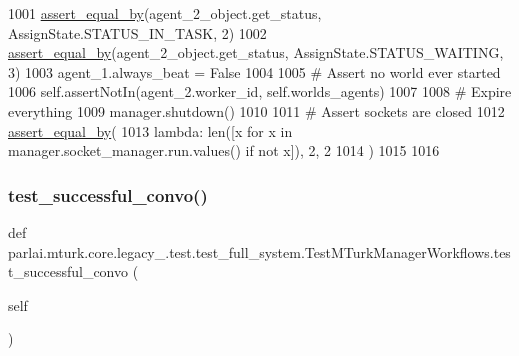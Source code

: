 \begin{DoxyCode}
1001         \hyperlink{namespaceparlai_1_1mturk_1_1core_1_1test_1_1test__full__system_a0b463246d35658a2e422010f13dcf819}{assert\_equal\_by}(agent\_2\_object.get\_status, AssignState.STATUS\_IN\_TASK, 2)
1002         \hyperlink{namespaceparlai_1_1mturk_1_1core_1_1test_1_1test__full__system_a0b463246d35658a2e422010f13dcf819}{assert\_equal\_by}(agent\_2\_object.get\_status, AssignState.STATUS\_WAITING, 3)
1003         agent\_1.always\_beat = \textcolor{keyword}{False}
1004 
1005         \textcolor{comment}{# Assert no world ever started}
1006         self.assertNotIn(agent\_2.worker\_id, self.worlds\_agents)
1007 
1008         \textcolor{comment}{# Expire everything}
1009         manager.shutdown()
1010 
1011         \textcolor{comment}{# Assert sockets are closed}
1012         \hyperlink{namespaceparlai_1_1mturk_1_1core_1_1test_1_1test__full__system_a0b463246d35658a2e422010f13dcf819}{assert\_equal\_by}(
1013             \textcolor{keyword}{lambda}: len([x \textcolor{keywordflow}{for} x \textcolor{keywordflow}{in} manager.socket\_manager.run.values() \textcolor{keywordflow}{if} \textcolor{keywordflow}{not} x]), 2, 2
1014         )
1015 
1016 
\end{DoxyCode}
\mbox{\label{classparlai_1_1mturk_1_1core_1_1legacy__2018_1_1test_1_1test__full__system_1_1TestMTurkManagerWorkflows_a296f430cd647d9d0f8f5dd600edd6d36}} 
\subsubsection{\texorpdfstring{test\+\_\+successful\+\_\+convo()}{test\_successful\_convo()}}
{\footnotesize\ttfamily def parlai.\+mturk.\+core.\+legacy\+\_.\+test.\+test\+\_\+full\+\_\+system.\+Test\+M\+Turk\+Manager\+Workflows.\+test\+\_\+successful\+\_\+convo (\begin{DoxyParamCaption}\item[{}]{self }\end{DoxyParamCaption})}



